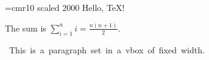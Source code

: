 \def\greet#1{Hello, #1!}

\font\big=cmr10 scaled 2000
\big
\greet{TeX}

\medskip
The sum is $\sum_{i=1}^{n} i = \frac{n(n+1)}{2}$.

\hbox{%
  \vbox{%
    \hsize=3in
    This is a paragraph set in a vbox of fixed width.
  }%
}

\bye
